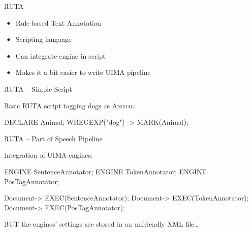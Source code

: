 \documentclass[10pt, compress, xcolor={usenames,dvipsnames}]{beamer}
\newcommand{\ID}[1]{{\textsc{#1}}}
\newcommand{\SmallArrow}{\ding{228}}
\renewcommand{\emph}[1]{\alert{#1}}
\begin{document}
\begin{frame}[fragile]{RUTA}

  \begin{itemize}[label=\SmallArrow, itemsep=1em]

    \item Rule-based Text Annotation

    \item Scripting language

    \item Can \emph{integrate engine} in script

    \item Makes it a bit easier to write UIMA pipeline

  \end{itemize}

\end{frame}

\begin{frame}[fragile]{RUTA -- Simple Script}

  Basic RUTA script tagging dogs as \ID{Animal}:

  \vspace{1em}

  \begin{lstruta}
DECLARE Animal;
W{REGEXP("dog") -> MARK(Animal)};
  \end{lstruta}

\end{frame}

\begin{frame}[fragile]{RUTA -- Part of Speech Pipeline}

  Integration of UIMA engines:

  \vspace{1em}

  \begin{lstruta}
ENGINE SentenceAnnotator;
ENGINE TokenAnnotator;
ENGINE PosTagAnnotator;

Document{-> EXEC(SentenceAnnotator)};
Document{-> EXEC(TokenAnnotator)};
Document{-> EXEC(PosTagAnnotator)};
  \end{lstruta}

  \pause

  \emph{BUT} the engines' settings are stored in an unfriendly XML file\ldots

\end{frame}
\end{document}
